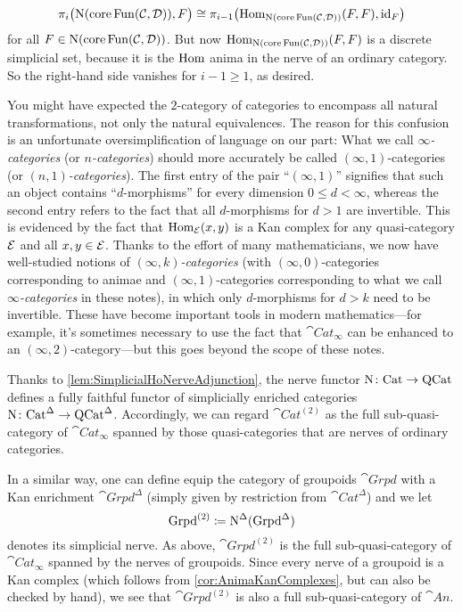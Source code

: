 \begin{exm}
{	\begin{equation*}
		\pi_i\bigl(\operatorname{N}(\operatorname{core}\operatorname{Fun}(\mathcal{C},\mathcal{D})),F\bigr)\cong \pi_{i-1}\bigl(\operatorname{Hom}_{\operatorname{N}(\operatorname{core}\operatorname{Fun}(\mathcal{C},\mathcal{D}))}(F,F),\operatorname{id}_F\bigr)
	\end{equation*}
	for all $F\in \operatorname{N}(\operatorname{core}\operatorname{Fun}(\mathcal{C},\mathcal{D}))$. But now $\operatorname{Hom}_{\operatorname{N}(\operatorname{core}\operatorname{Fun}(\mathcal{C},\mathcal{D}))}(F,F)$ is a discrete simplicial set, because it is the $\operatorname{Hom}$ anima in the nerve of an ordinary category. So the right-hand side vanishes for $i-1\geqslant 1$, as desired.
	
	You might have expected the $2$-category of categories to encompass all natural transformations, not only the natural equivalences. The reason for this confusion is an unfortunate oversimplification of language on our part: What we call \emph{$\infty$-categories} (or \emph{$n$-categories}) should more accurately be called $(\infty,1)$-categories (or \emph{$(n,1)$-categories}). The first entry of the pair \enquote{$(\infty,1)$} signifies that such an object contains \enquote{$d$-morphisms} for every dimension $0\leqslant d<\infty$, whereas the second entry refers to the fact that all $d$-morphisms for $d>1$ are invertible. This is evidenced by the fact that $\operatorname{Hom}_{\mathcal{E}}(x,y)$ is a Kan complex for any quasi-category $\mathcal{E}$ and all $x,y\in \mathcal{E}$. Thanks to the effort of many mathematicians, we now have well-studied notions of \emph{$(\infty,k)$-categories} (with $(\infty,0)$-categories corresponding to animae and $(\infty,1)$-categories corresponding to what we call \emph{$\infty$-categories} in these notes), in which only $d$-morphisms for $d>k$ need to be invertible. These have become important tools in modern mathematics---for example, it's sometimes necessary to use the fact that $\cat{Cat}_\infty$ can be enhanced to an $(\infty,2)$-category---but this goes beyond the scope of these notes.}
	
	Thanks to \cref{lem:SimplicialHoNerveAdjunction}, the nerve functor $\operatorname{N}\colon \mathrm{Cat}\rightarrow\mathrm{QCat}$ defines a fully faithful functor of simplicially enriched categories $\operatorname{N}\colon \mathrm{Cat}^\Delta\rightarrow \mathrm{QCat}^\Delta$. Accordingly, we can regard $\cat{Cat}^{(2)}$ as the full sub-quasi-category of $\cat{Cat}_\infty$ spanned by those quasi-categories that are nerves of ordinary categories.
	
	In a similar way, one can define equip the category of groupoids $\cat{Grpd}$ with a Kan enrichment $\cat{Grpd}^\Delta$ (simply given by restriction from $\cat{Cat}^\Delta$) and we let
	\begin{equation*}
		\mathrm{Grpd}^{(2)}\coloneqq \operatorname{N}^\Delta(\mathrm{Grpd}^\Delta)
	\end{equation*}
	denotes its simplicial nerve. As above, $\cat{Grpd}^{(2)}$ is the full sub-quasi-category of $\cat{Cat}_\infty$ spanned by the nerves of groupoids. Since every nerve of a groupoid is a Kan complex (which follows from \cref{cor:AnimaKanComplexes}, but can also be checked by hand), we see that $\cat{Grpd}^{(2)}$ is also a full sub-quasi-category of $\cat{An}$.
\end{exm}

